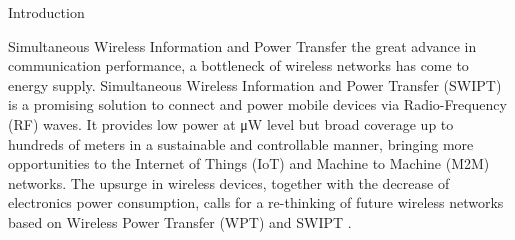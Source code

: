 \documentclass[journal,12pt,onecolumn,draftclsnofoot]{IEEEtran}
\begin{document}
	\begin{section}{Introduction}
		\begin{subsection}{Simultaneous Wireless Information and Power Transfer}
			 the great advance in communication performance, a bottleneck of wireless networks has come to energy supply. Simultaneous Wireless Information and Power Transfer (SWIPT) is a promising solution to connect and power mobile devices via Radio-Frequency (RF) waves. It provides low power at \si{\uW} level but broad coverage up to hundreds of meters in a sustainable and controllable manner, bringing more opportunities to the Internet of Things (IoT) and Machine to Machine (M2M) networks. The upsurge in wireless devices, together with the decrease of electronics power consumption, calls for a re-thinking of future wireless networks based on Wireless Power Transfer (WPT) and SWIPT \cite{Clerckx2019}.


\end{subsection}
\end{section}
\end{document}
